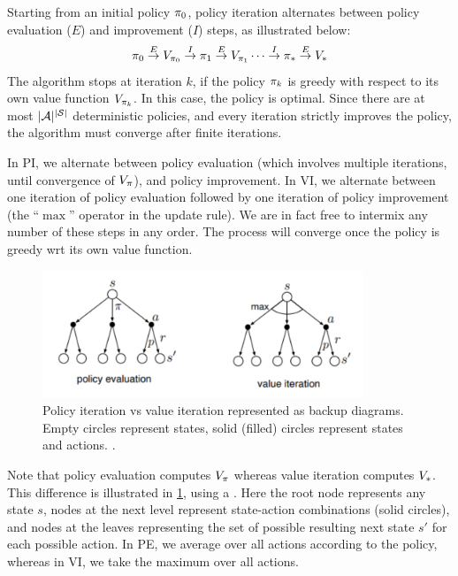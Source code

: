Starting from an initial policy $\pi_0$, policy iteration alternates
between policy evaluation ($E$)
and improvement ($I$) steps,
as illustrated below:
\begin{align}
\pi_0 \stackrel{E}{\rightarrow} V_{\pi_0}
\stackrel{I}{\rightarrow} \pi_1
\stackrel{E}{\rightarrow} V_{\pi_1}
\cdots
\stackrel{I}{\rightarrow} \pi_{*}
\stackrel{E}{\rightarrow} V_{*}
\end{align}
The algorithm stops at iteration $k$, if the policy $\pi_k$
is greedy with respect to its own value function $V_{\pi_k}$.
In this case, the policy is optimal.
Since there are at most $|\mathcal{A}|^{|\mathcal{S}|}$ deterministic policies,
and every iteration strictly improves the policy, the algorithm must converge after finite iterations.


In PI,
we alternate between policy evaluation (which involves multiple
iterations, until convergence of $V_{\pi}$),
and policy improvement.
In VI, we alternate between
one iteration of policy evaluation followed
by one iteration of policy improvement
(the ``$\max$'' operator in the update rule).
We are in fact free to intermix any number of
these steps in any order.
The process will converge once the
policy is greedy wrt its own  value function.



\begin{figure}
\centering
\includegraphics[height=1.5in]{figs/sutton-8-6-PI-VI}
\caption{
  Policy iteration vs value iteration represented as backup diagrams.
  Empty circles represent states, solid (filled) circles
  represent states and actions.
  .
}
\label{fig:sutton-8-6}
\end{figure}

Note that policy evaluation computes $V_{\pi}$
whereas value iteration computes $V_{*}$.
This difference is illustrated in \cref{fig:sutton-8-6},
using a .
Here the root node represents any state $s$,
nodes at the next level represent state-action combinations
(solid circles),
and nodes at the leaves representing the set of possible
resulting next state $s'$ for each possible action.
In PE, we average over all actions according
to the policy, whereas in VI, we take the maximum over
all actions.

